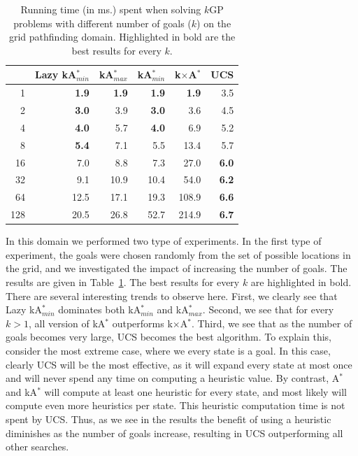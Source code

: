 \documentclass{aicom2e}
\newcommand{\kgs}{$k$GP}
\newcommand{\astar}{A$^*$}
\newcommand{\kastar}{kA$^*$}
\newcommand{\kastarmin}{kA$^*_{min}$}
\newcommand{\kastarmax}{kA$^*_{max}$}
\newcommand{\kxastar}{k$\times$A$^*$}
\begin{document}
\begin{table}[]
    \centering
    \begin{tabular}{|r|r|r|r|r|r|}
    \hline
        & \multicolumn{1}{c|}{Lazy \kastarmin{}} & \kastarmax &      \kastarmin       &  \kxastar & UCS       \\

        \hline
1     & \textbf{1.9}                 & \textbf{1.9} & \textbf{1.9} & \textbf{1.9} & 3.5          \\
2     & \textbf{3.0}                 & 3.9          & \textbf{3.0} & 3.6          & 4.5          \\
4     & \textbf{4.0}                 & 5.7          & \textbf{4.0} & 6.9          & 5.2          \\
8     & \textbf{5.4}                 & 7.1          & 5.5          & 13.4         & 5.7          \\
16    & 7.0                          & 8.8          & 7.3          & 27.0         & \textbf{6.0} \\
32    & 9.1                          & 10.9         & 10.4         & 54.0         & \textbf{6.2} \\
64    & 12.5                         & 17.1         & 19.3         & 108.9        & \textbf{6.6} \\
128   & 20.5                         & 26.8         & 52.7         & 214.9 &
\textbf{6.7}\\
\hline
    \end{tabular}
    \caption{Running time (in ms.) spent when solving \kgs{} problems with different number of goals ($k$) on the grid pathfinding domain. Highlighted in bold are the best results for every $k$.}
    \label{tab:pathfinding-runtime}
\end{table}

In this domain we performed two type of experiments. In the first type of experiment, the goals were chosen randomly from the set of possible locations in the grid, and we investigated the impact of increasing the number of goals. The results are given in Table~\ref{tab:pathfinding-runtime}. The best results for every $k$ are highlighted in bold. There are several interesting trends to observe here. First, we clearly see that Lazy \kastarmin{} dominates both \kastarmin{} and \kastarmax{}. Second, we see that for every $k>1$, all version of \kastar{} outperforms \kxastar{}. Third, we see that as the number of goals becomes very large, UCS becomes the best algorithm. To explain this, consider the most extreme case, where we every state is a goal. In this case, clearly UCS will be the most effective, as it will expand every state at most once and will never spend any time on computing a heuristic value. By contrast, \astar{} and \kastar{} will compute at least one heuristic for every state, and most likely will compute even more heuristics per state. This heuristic computation time is not spent by UCS. Thus, as we see in the results the benefit of using a heuristic diminishes as the number of goals increase, resulting in UCS outperforming all other searches.
\end{document}

